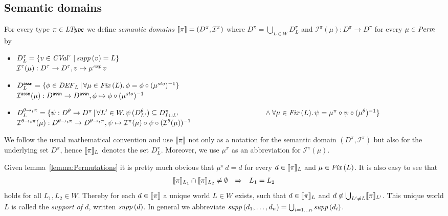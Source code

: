 \documentclass[12pt,a4paper]{report}
\newcommand{\CVal}{\nstyle{CVal}}
\newcommand{\sexp}{\nstyle{exp}}
\newcommand{\ssto}{\nstyle{sto}}
\newcommand{\DEF}{\nstyle{DEF}}
\newcommand{\I}{\mathcal{I}}
\newcommand{\Fix}[1]{\nstyle{Fix}\,(#1)}
\begin{document}

\subsection{Semantic domains}

\begin{definition}
  For every type $\pi\in\mathit{LType}$ we define {\em semantic domains} $\semantic{\pi} = (D^\pi,\I^\pi)$ where
  $D^\pi = \bigcup_{L \in W} D^\pi_L$ and $\I^\pi(\mu) : D^\pi \to D^\pi$ for every $\mu \in \mathit{Perm}$ by
  \begin{itemize}
    \item $D^\tau_L = \{v\in\CVal^\tau\,|\,\supp{v} = L\}$ \\
          $\I^\tau(\mu): D^\tau \to D^\tau, v \mapsto \mu^\sexp\,v$

    \item $D^\tassn_L = \{ \phi\in\DEF_L\,|\,\forall \mu\in\Fix{L}.\,\phi = \phi \circ (\mu^\ssto)^{-1}\}$ \\
          $\I^\tassn(\mu): D^\tassn \to D^\tassn, \phi \mapsto \phi \circ (\mu^\ssto)^{-1}$

    \item $D^{\ttarrow{\theta}{\pi}}_L = \{ \psi: D^\theta \to D^\pi\,|\,
                          \forall L'\in W.\,\psi\,(D^\theta_{L'}) \subseteq D^\pi_{L \cup L'} \\
                          \hspace*{4.2cm} \wedge \forall \mu\in\Fix{L}.\,\psi=\mu^\pi\circ\psi\circ(\mu^\theta)^{-1}\}$\\
          $\I^{\ttarrow{\theta}{\pi}}(\mu): D^{\ttarrow{\theta}{\pi}} \to D^{\ttarrow{\theta}{\pi}},
                                            \psi \mapsto \I^\pi(\mu) \circ \psi \circ (\I^\theta(\mu))^{-1}$
  \end{itemize}
\end{definition}

We follow the usual mathematical convention and use $\llbracket\pi\rrbracket$ not only as a notation
for the semantic domain $(D^\pi,\I^\pi)$ but also for the underlying set $D^\pi$,
hence $\llbracket\pi\rrbracket_L$ denotes the set $D^\pi_L$. Moreover, we use $\mu^\pi$ as an abbreviation
for $\I^\pi(\mu)$.

Given lemma~\ref{lemma:Permutations}
it is pretty much obvious that $\mu^\pi\,d = d$ for every $d \in \llbracket\pi\rrbracket_L$ and
$\mu\in\Fix{L}$.
It is also easy to see that
\[\begin{array}{rcl}
  \llbracket\pi\rrbracket_{L_1} \cap \llbracket\pi\rrbracket_{L_2} \ne \emptyset &\Rightarrow& L_1=L_2
\end{array}\]
holds for all $L_1,L_2\in W$. Thereby for each $d \in \llbracket\pi\rrbracket$ a
unique world $L \in W$ exists, such that $d \in \llbracket\pi\rrbracket_L$ and $d \not\in \bigcup_{L'\ne L} \llbracket\pi\rrbracket_{L'}$.
This unique world $L$ is called the {\em support of $d$}, written $\mathit{supp}\,(d)$. In general we abbreviate
$\mathit{supp}\,(d_1,\ldots,d_n) = \bigcup_{i=1\ldots n}\mathit{supp}\,(d_i)$.
\end{document}
